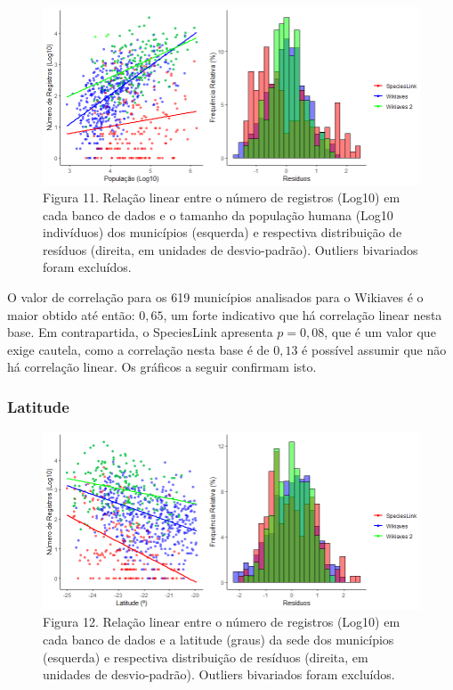 \begin{figure}[h!]
\centering
\includegraphics[width = 15cm]{Imagens/G03.png}
\\{\scriptsize Figura 11. Relação linear entre o número de registros (Log10) em cada banco de dados e o tamanho da população humana (Log10 indivíduos) dos municípios (esquerda) e respectiva distribuição de resíduos (direita, em unidades de desvio-padrão). Outliers bivariados foram excluídos.}
\end{figure}

\begin{resposta}
 O valor de correlação para os 619 municípios analisados para o Wikiaves é o maior obtido até então: $0,65$, um forte indicativo que há correlação linear nesta base. Em contrapartida, o SpeciesLink apresenta $p = 0,08$, que é um valor que exige cautela, como a correlação nesta base é de $0,13$ é possível assumir que não há correlação linear. Os gráficos a seguir confirmam isto.
 
\end{resposta}

\subsubsection{Latitude}

\begin{figure}[h!]
\centering
\includegraphics[width = 15cm]{Imagens/G04.png}
\\{\scriptsize Figura 12. Relação linear entre o número de registros (Log10) em cada banco de dados e a latitude (graus) da sede dos municípios (esquerda) e respectiva distribuição de resíduos (direita, em unidades de desvio-padrão). Outliers bivariados foram excluídos.}
\end{figure}

